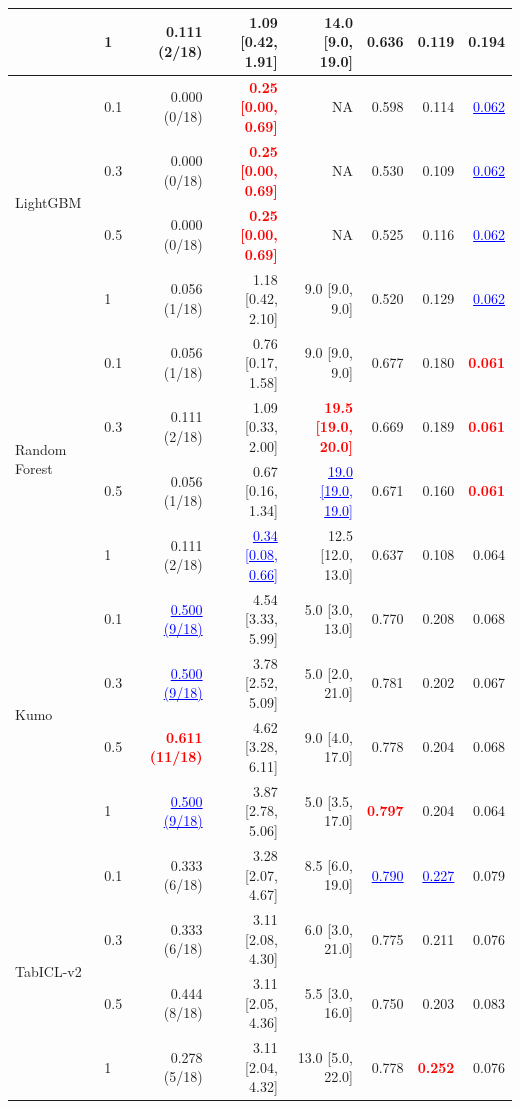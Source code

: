 \begin{table}[pos=!htbp,align=\centering]
{\begin{tabular}{llrrrrrr}
 & 1 & 0.111 (2/18) & 1.09 [0.42, 1.91] & 14.0 [9.0, 19.0] & 0.636 & 0.119 & 0.194 \\
\midrule
\multirow{4}{*}{LightGBM} & 0.1 & 0.000 (0/18) & \textcolor{red}{\textbf{0.25 [0.00, 0.69]}} & NA & 0.598 & 0.114 & \textcolor{blue}{\underline{0.062}} \\
 & 0.3 & 0.000 (0/18) & \textcolor{red}{\textbf{0.25 [0.00, 0.69]}} & NA & 0.530 & 0.109 & \textcolor{blue}{\underline{0.062}} \\
 & 0.5 & 0.000 (0/18) & \textcolor{red}{\textbf{0.25 [0.00, 0.69]}} & NA & 0.525 & 0.116 & \textcolor{blue}{\underline{0.062}} \\
 & 1 & 0.056 (1/18) & 1.18 [0.42, 2.10] & 9.0 [9.0, 9.0] & 0.520 & 0.129 & \textcolor{blue}{\underline{0.062}} \\
\midrule
\multirow{4}{*}{Random Forest} & 0.1 & 0.056 (1/18) & 0.76 [0.17, 1.58] & 9.0 [9.0, 9.0] & 0.677 & 0.180 & \textcolor{red}{\textbf{0.061}} \\
 & 0.3 & 0.111 (2/18) & 1.09 [0.33, 2.00] & \textcolor{red}{\textbf{19.5 [19.0, 20.0]}} & 0.669 & 0.189 & \textcolor{red}{\textbf{0.061}} \\
 & 0.5 & 0.056 (1/18) & 0.67 [0.16, 1.34] & \textcolor{blue}{\underline{19.0 [19.0, 19.0]}} & 0.671 & 0.160 & \textcolor{red}{\textbf{0.061}} \\
 & 1 & 0.111 (2/18) & \textcolor{blue}{\underline{0.34 [0.08, 0.66]}} & 12.5 [12.0, 13.0] & 0.637 & 0.108 & 0.064 \\
\midrule
\multirow{4}{*}{Kumo} & 0.1 & \textcolor{blue}{\underline{0.500 (9/18)}} & 4.54 [3.33, 5.99] & 5.0 [3.0, 13.0] & 0.770 & 0.208 & 0.068 \\
 & 0.3 & \textcolor{blue}{\underline{0.500 (9/18)}} & 3.78 [2.52, 5.09] & 5.0 [2.0, 21.0] & 0.781 & 0.202 & 0.067 \\
 & 0.5 & \textcolor{red}{\textbf{0.611 (11/18)}} & 4.62 [3.28, 6.11] & 9.0 [4.0, 17.0] & 0.778 & 0.204 & 0.068 \\
 & 1 & \textcolor{blue}{\underline{0.500 (9/18)}} & 3.87 [2.78, 5.06] & 5.0 [3.5, 17.0] & \textcolor{red}{\textbf{0.797}} & 0.204 & 0.064 \\
\midrule
\multirow{4}{*}{TabICL-v2} & 0.1 & 0.333 (6/18) & 3.28 [2.07, 4.67] & 8.5 [6.0, 19.0] & \textcolor{blue}{\underline{0.790}} & \textcolor{blue}{\underline{0.227}} & 0.079 \\
 & 0.3 & 0.333 (6/18) & 3.11 [2.08, 4.30] & 6.0 [3.0, 21.0] & 0.775 & 0.211 & 0.076 \\
 & 0.5 & 0.444 (8/18) & 3.11 [2.05, 4.36] & 5.5 [3.0, 16.0] & 0.750 & 0.203 & 0.083 \\
 & 1 & 0.278 (5/18) & 3.11 [2.04, 4.32] & 13.0 [5.0, 22.0] & 0.778 & \textcolor{red}{\textbf{0.252}} & 0.076 \\
\bottomrule
\end{tabular}
}
\end{table}
